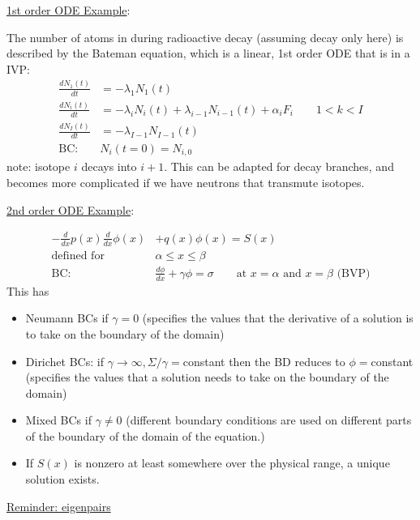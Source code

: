 \documentclass[12pt]{article}
\newcommand{\Macro}{\ensuremath{\Sigma}}
\begin{document}
\vspace*{1em}
\noindent \underline{1st order ODE Example}:

The number of atoms in during radioactive decay (assuming decay only here) is described by the Bateman equation, which is a linear, 1st order ODE that is in a IVP:
%
\begin{align}
\frac{dN_1(t)}{dt} &= -\lambda_1 N_1(t) \nonumber \\
\frac{dN_i(t)}{dt} &= -\lambda_i N_i(t) + \lambda_{i-1}N_{i-1}(t) + \alpha_i F_i \qquad 1 < k < I \nonumber\\
\frac{dN_I(t)}{dt} &= -\lambda_{I-1} N_{I-1}(t) \nonumber \\
\text{BC: }& N_i(t=0) = N_{i,0}\nonumber
\end{align}
%
note: isotope $i$ decays into $i+1$. This can be adapted for decay branches, and becomes more complicated if we have neutrons that transmute isotopes. 

\vspace*{1em}
\noindent \underline{2nd order ODE Example}:

\begin{align}
-\frac{d}{dx}p(x) \frac{d}{dx}\phi(x) &+ q(x)\phi(x) = S(x) \nonumber \\
\text{defined for }& \alpha \le x \le \beta \nonumber \\
\text{BC: }& \frac{d\phi}{dx} + \gamma \phi = \sigma \qquad \text{at } x=\alpha \text{ and } x = \beta \text{ (BVP)}\nonumber
\end{align}
%
This has
\begin{itemize}
\item Neumann BCs if $\gamma = 0$ (specifies the values that the derivative of a solution is to take on the boundary of the domain)
\item Dirichet BCs: if $\gamma \rightarrow \infty, \Macro / \gamma = $constant then the BD reduces to $\phi = $constant (specifies the values that a solution needs to take on the boundary of the domain)
\item Mixed BCs if $\gamma \ne 0$ (different boundary conditions are used on different parts of the boundary of the domain of the equation.)
\item If $S(x)$ is nonzero at least somewhere over the physical range, a unique solution exists.
\end{itemize}

\vspace*{1 em} \underline{Reminder: eigenpairs}
\end{document}
